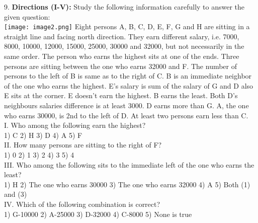 \documentclass[
]{article}
\begin{document}
9. \textbf{Directions (I-V):} Study the following information carefully to answer the given question:\\
\texttt{[image: image2.png]}
Eight persons A, B, C, D, E, F, G and H are sitting in a straight line and facing north
direction. They earn different salary, i.e. 7000, 8000, 10000, 12000, 15000, 25000, 30000 and
32000, but not necessarily in the same order. The person who earns the highest sits at one of
the ends. Three persons are sitting between the one who earns 32000 and F. The number of
persons to the left of B is same as to the right of C. B is an immediate neighbor of the one
who earns the highest. E’s salary is sum of the salary of G and D also E sits at the corner. E
doesn’t earn the highest. B earns the least. Both D’s neighbours salaries difference is at least
3000. D earns more than G. A, the one who earns 30000, is 2nd to the left of D. At least two
persons earn less than C.\\
I. Who among the following earn the highest?\\
1) C \hspace{2mm}2) H \hspace{2mm}3) D \hspace{2mm}4) A \hspace{2mm}5) F\\

II. How many persons are sitting to the right of F?\\
1) 0 \hspace{2mm}2) 1 \hspace{2mm}3) 2 \hspace{2mm}4) 3 \hspace{2mm}5) 4\\

III. Who among the following sits to the immediate left of the one who earns the least?\\
1) H 2) The one who earns 30000
\hspace{2mm}3) The one who earns 32000 \hspace{2mm}4) A
\hspace{2mm}5) Both (1) and (3)\\

IV. Which of the following combination is correct?\\
1) G-10000 \hspace{2mm}2) A-25000 \hspace{2mm}3) D-32000 \hspace{2mm}4) C-8000 \hspace{2mm}5) None is true\\
\end{document}
